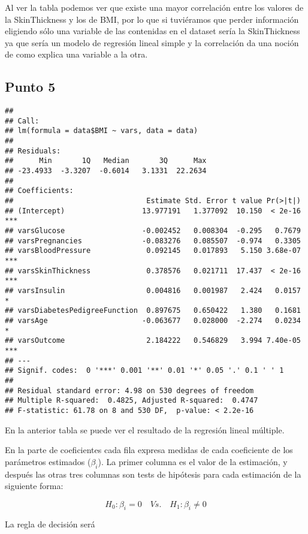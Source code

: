 \documentclass[
]{article}
\begin{document}
Al ver la tabla podemos ver que existe una mayor correlación entre los
valores de la SkinThickness y los de BMI, por lo que si tuviéramos que
perder información eligiendo sólo una variable de las contenidas en el
dataset sería la SkinThickness ya que sería un modelo de regresión
lineal simple y la correlación da una noción de como explica una
variable a la otra.

\hypertarget{punto-5}{%
\subsection{Punto 5}\label{punto-5}}

\begin{verbatim}
## 
## Call:
## lm(formula = data$BMI ~ vars, data = data)
## 
## Residuals:
##      Min       1Q   Median       3Q      Max 
## -23.4933  -3.3207  -0.6014   3.1331  22.2634 
## 
## Coefficients:
##                               Estimate Std. Error t value Pr(>|t|)    
## (Intercept)                  13.977191   1.377092  10.150  < 2e-16 ***
## varsGlucose                  -0.002452   0.008304  -0.295   0.7679    
## varsPregnancies              -0.083276   0.085507  -0.974   0.3305    
## varsBloodPressure             0.092145   0.017893   5.150 3.68e-07 ***
## varsSkinThickness             0.378576   0.021711  17.437  < 2e-16 ***
## varsInsulin                   0.004816   0.001987   2.424   0.0157 *  
## varsDiabetesPedigreeFunction  0.897675   0.650422   1.380   0.1681    
## varsAge                      -0.063677   0.028000  -2.274   0.0234 *  
## varsOutcome                   2.184222   0.546829   3.994 7.40e-05 ***
## ---
## Signif. codes:  0 '***' 0.001 '**' 0.01 '*' 0.05 '.' 0.1 ' ' 1
## 
## Residual standard error: 4.98 on 530 degrees of freedom
## Multiple R-squared:  0.4825, Adjusted R-squared:  0.4747 
## F-statistic: 61.78 on 8 and 530 DF,  p-value: < 2.2e-16
\end{verbatim}

En la anterior tabla se puede ver el resultado de la regresión lineal
múltiple.

En la parte de coeficientes cada fila expresa medidas de cada
coeficiente de los parámetros estimados (\(\beta_i\)). La primer columna
es el valor de la estimación, y después las otras tres columnas son
tests de hipótesis para cada estimación de la siguiente forma:

\[
H_{0}: \beta_{i}=0 \quad V s . \quad H_{1}: \beta_{i} \neq 0
\]

La regla de decisión será
\end{document}
